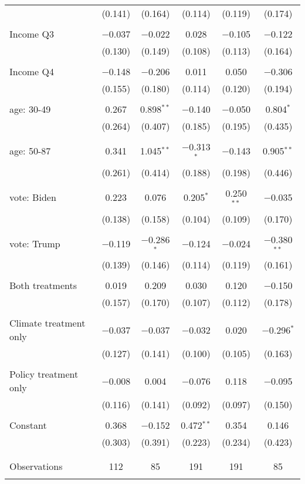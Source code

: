 \begin{tabular}{@{\extracolsep{5pt}}lccccc}
  & (0.141) & (0.164) & (0.114) & (0.119) & (0.174) \\ 
  & & & & & \\ 
 Income Q3 & $-$0.037 & $-$0.022 & 0.028 & $-$0.105 & $-$0.122 \\ 
  & (0.130) & (0.149) & (0.108) & (0.113) & (0.164) \\ 
  & & & & & \\ 
 Income Q4 & $-$0.148 & $-$0.206 & 0.011 & 0.050 & $-$0.306 \\ 
  & (0.155) & (0.180) & (0.114) & (0.120) & (0.194) \\ 
  & & & & & \\ 
 age: 30-49 & 0.267 & 0.898$^{**}$ & $-$0.140 & $-$0.050 & 0.804$^{*}$ \\ 
  & (0.264) & (0.407) & (0.185) & (0.195) & (0.435) \\ 
  & & & & & \\ 
 age: 50-87 & 0.341 & 1.045$^{**}$ & $-$0.313$^{*}$ & $-$0.143 & 0.905$^{**}$ \\ 
  & (0.261) & (0.414) & (0.188) & (0.198) & (0.446) \\ 
  & & & & & \\ 
 vote: Biden & 0.223 & 0.076 & 0.205$^{*}$ & 0.250$^{**}$ & $-$0.035 \\ 
  & (0.138) & (0.158) & (0.104) & (0.109) & (0.170) \\ 
  & & & & & \\ 
 vote: Trump & $-$0.119 & $-$0.286$^{*}$ & $-$0.124 & $-$0.024 & $-$0.380$^{**}$ \\ 
  & (0.139) & (0.146) & (0.114) & (0.119) & (0.161) \\ 
  & & & & & \\ 
 Both treatments & 0.019 & 0.209 & 0.030 & 0.120 & $-$0.150 \\ 
  & (0.157) & (0.170) & (0.107) & (0.112) & (0.178) \\ 
  & & & & & \\ 
 Climate treatment only & $-$0.037 & $-$0.037 & $-$0.032 & 0.020 & $-$0.296$^{*}$ \\ 
  & (0.127) & (0.141) & (0.100) & (0.105) & (0.163) \\ 
  & & & & & \\ 
 Policy treatment only & $-$0.008 & 0.004 & $-$0.076 & 0.118 & $-$0.095 \\ 
  & (0.116) & (0.141) & (0.092) & (0.097) & (0.150) \\ 
  & & & & & \\ 
 Constant & 0.368 & $-$0.152 & 0.472$^{**}$ & 0.354 & 0.146 \\ 
  & (0.303) & (0.391) & (0.223) & (0.234) & (0.423) \\ 
  & & & & & \\ 
\hline \\[-1.8ex] 

Observations & 112 & 85 & 191 & 191 & 85 \\ 
\hline 
\hline \\[-1.8ex] 
\end{tabular} 